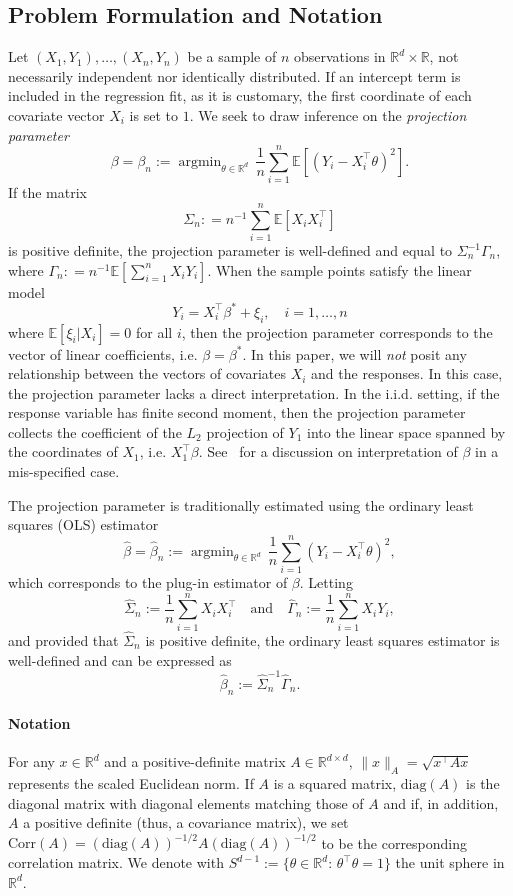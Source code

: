 \documentclass[11pt]{article}
\DeclareMathOperator*{\argmin}{argmin}
\begin{document}
\subsection*{Problem Formulation and Notation}
Let $(X_1,Y_1), \ldots, (X_n,Y_n)$ be a sample of $n$ observations in $\mathbb{R}^{d} \times \mathbb{R}$, not necessarily independent nor identically distributed. If an intercept term is included in the regression fit, as it is customary, the first coordinate of each covariate vector $X_i$ is set to $1$. 
We seek to draw inference on the {\it projection parameter}
\[
\beta = \beta_n := \argmin_{\theta\in\mathbb{R}^d}\,\frac{1}{n}\sum_{i=1}^n \mathbb{E}[(Y_i - X_i^{\top}\theta)^2].
\]
If the matrix
\[
\Sigma_n : = n^{-1}\sum_{i=1}^n \mathbb{E}[X_iX_i^{\top}]
\]
is positive definite, the projection parameter  is well-defined and equal to $\Sigma_n^{-1} \Gamma_n$, where $\Gamma_n : = n^{-1}\mathbb{E} \left[ \sum_{i=1}^n X_i Y_i\right]$.
When the sample points satisfy the linear model
\[
Y_i = X_i^\top \beta^* + \xi_i, \quad i=1,\ldots,n
\] 
where $\mathbb{E}[\xi_i | X_i ] = 0$ for all $i$, then the projection parameter corresponds to the vector of linear coefficients, i.e. $\beta = \beta^*$. In this paper, we will \emph{not} posit any relationship between the vectors of covariates $X_i$ and the responses. In this case, the projection parameter lacks a direct interpretation. In the i.i.d. setting, if the response variable has finite second moment, then the projection parameter collects the coefficient of the $L_2$ projection of $Y_1$ into the linear space spanned by the coordinates of $X_1$, i.e. $X_1^\top \beta$. See~\cite{Buja14,Buja16} for a discussion on interpretation of $\beta$ in a mis-specified case.

The projection parameter is traditionally estimated using the ordinary least squares (OLS) estimator 
\[
\widehat{\beta} = \widehat{\beta}_n := \argmin_{\theta\in\mathbb{R}^d}\,\frac{1}{n}\sum_{i=1}^n (Y_i - X_i^{\top}\theta)^2,
\]
which corresponds to the plug-in estimator of $\beta$.
Letting 
\[
\widehat{\Sigma}_n := \frac{1}{n}\sum_{i=1}^n X_iX_i^{\top}\quad\mbox{and}\quad \widehat{\Gamma}_n := \frac{1}{n}\sum_{i=1}^n X_iY_i,
\]
and provided that $\widehat{\Sigma}_n$ is positive definite, the ordinary least squares estimator is well-defined and can be expressed as  
\[
\widehat{\beta}_n := \widehat{\Sigma}_n^{-1} \widehat{\Gamma}_n.
\]
\paragraph{Notation} For any $x\in\mathbb{R}^d$ and a positive-definite matrix $A\in\mathbb{R}^{d\times d}$, $\|x\|_A = \sqrt{x^{\top}A x}$ represents the scaled Euclidean norm. If $A$ is a squared matrix, $\mbox{diag}(A)$ is the diagonal matrix with diagonal elements matching those of $A$ and if, in addition, $A$ a positive definite (thus, a covariance matrix), we set $\mbox{Corr}(A) = (\mathrm{diag}(A))^{-1/2}A(\mathrm{diag}(A))^{-1/2}$ to be the corresponding correlation matrix.  We denote with $S^{d-1} := \{\theta\in\mathbb{R}^d:\,\theta^{\top}\theta = 1\}$ the unit sphere in $\mathbb{R}^d$.
\end{document}
